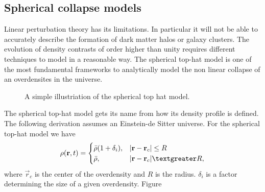 \subsection{Spherical collapse models}
Linear perturbation theory has its limitations. In particular it will not be
able to accurately describe the formation of dark matter halos or galaxy
clusters. The evolution of density contrasts of order higher than unity requires
different techniques to model in a reasonable way. The spherical top-hat model
is one of the most fundamental frameworks to analytically model the non linear
collapse of an overdensites in the universe.
\begin{figure}\label{fig:tophat}
    \caption{A simple illustriation of the spherical top hat model.}
\end{figure}
The spherical top-hat model gets its name from how its density profile is
defined. The following derivation assumes an Einstein-de Sitter universe.
For the spherical top-hat model we have
\begin{equation}
    \rho(\vec{r},t) =
    \begin{cases} 
        \bar{\rho}(1+\delta_i), & \vert\vec{r}-\vec{r}_c\vert\leq R \\
        \bar{\rho}, & \vert\vec{r}-\vec{r}_c\vert \textgreater R,
     \end{cases} 
\end{equation}
where $\vec{r}_c$ is the center of the overdensity and $R$ is the radius.
$\delta_i$ is a factor determining the size of a given overdensity. Figure
